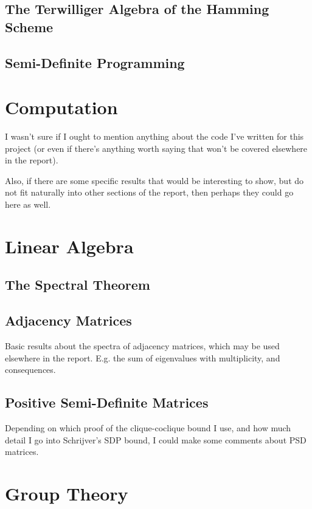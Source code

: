\documentclass{report}
\begin{document}
  \section{The Terwilliger Algebra of the Hamming Scheme}

  \section{Semi-Definite Programming}

\chapter{Computation}
  I wasn't sure if I ought to mention anything about the code I've written for
  this project (or even if there's anything worth saying that won't be covered
  elsewhere in the report).

  Also, if there are some specific results that would be interesting to show,
  but do not fit naturally into other sections of the report, then perhaps they
  could go here as well.

\appendix

\chapter{Linear Algebra}
  \section{The Spectral Theorem}

  \section{Adjacency Matrices}
    Basic results about the spectra of adjacency matrices, which may be used
    elsewhere in the report.  E.g. the sum of eigenvalues with multiplicity, and
    consequences.

  \section{Positive Semi-Definite Matrices}
    Depending on which proof of the clique-coclique bound I use, and how much
    detail I go into Schrijver's SDP bound, I could make some comments about PSD
    matrices.

\chapter{Group Theory}
\end{document}
